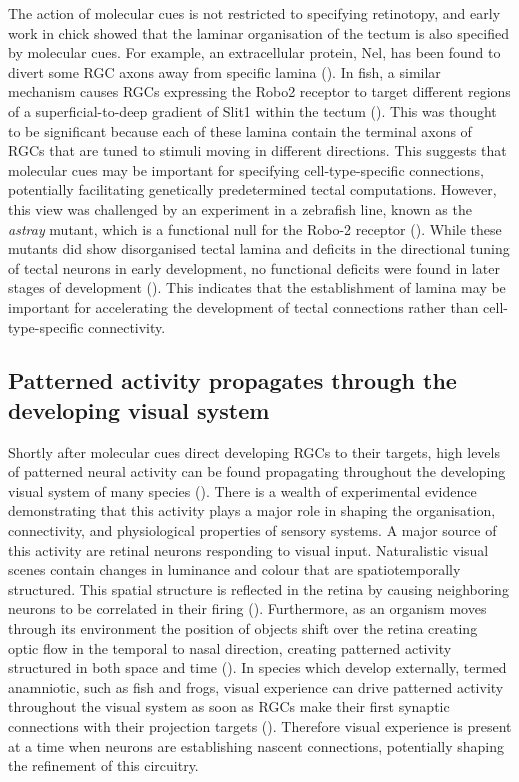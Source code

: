 The action of molecular cues is not restricted to specifying retinotopy, and early work in chick showed that the laminar organisation of the tectum is also specified by molecular cues. For example, an extracellular protein, Nel, has been found to divert some RGC axons away from specific lamina (\cite{Jiang2009InNel}). In fish, a similar mechanism causes RGCs expressing the Robo2 receptor to target different regions of a superficial-to-deep gradient of Slit1 within the tectum (\cite{Xiao2011AssemblyCollagen}). This was thought to be significant because each of these lamina contain the terminal axons of RGCs that are tuned to stimuli moving in different directions. This suggests that molecular cues may be important for specifying cell-type-specific connections, potentially facilitating genetically predetermined tectal computations. However, this view was challenged by an experiment in a zebrafish line, known as the \textit{astray} mutant, which is a functional null for the Robo-2 receptor (\cite{Campbell2007Slit1aPathways}). While these mutants did show disorganised tectal lamina and deficits in the directional tuning of tectal neurons in early development, no functional deficits were found in later stages of development (\cite{Nikolaou2015LaminationCircuits}). This indicates that the establishment of lamina may be important for accelerating the development of tectal connections rather than cell-type-specific connectivity.

\subsection{Patterned activity propagates through the developing visual system}

Shortly after molecular cues direct developing RGCs to their targets, high levels of patterned neural activity can be found propagating throughout the developing visual system of many species (\cite{Pratt2016AnDevelopment}). There is a wealth of experimental evidence demonstrating that this activity plays a major role in shaping the organisation, connectivity, and physiological properties of sensory systems. A major source of this activity are retinal neurons responding to visual input. Naturalistic visual scenes contain changes in luminance and colour that are spatiotemporally structured. This spatial structure is reflected in the retina by causing neighboring neurons to be correlated in their firing (\cite{Demas2012VisionRetina}). Furthermore, as an organism moves through its environment the position of objects shift over the retina creating optic flow in the temporal to nasal direction, creating patterned activity structured in both space and time  (\cite{Hiramoto2014OpticInformation}). In species which develop externally, termed anamniotic, such as fish and frogs, visual experience can drive patterned activity throughout the visual system as soon as RGCs make their first synaptic connections with their projection targets (\cite{Holt1983OrderFibres}). Therefore visual experience is present at a time when neurons are establishing nascent connections, potentially shaping the refinement of this circuitry.

